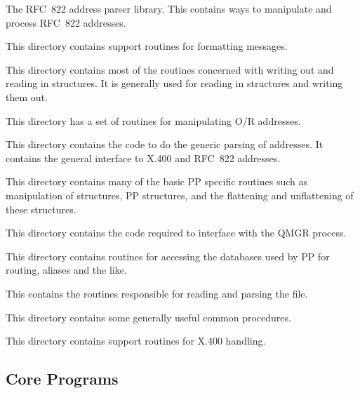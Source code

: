 \begin{describe}
\item[\verb|addr/|:]	The RFC~822 address parser
library. This
contains ways to manipulate and process RFC~822 addresses.

\item[\verb|format/|:]	This directory contains support routines for
formatting messages.

\item[\verb|io/|:]	This directory contains most of the routines
concerned with writing out and reading in structures. It is generally
used for reading in structures and writing them out.

\item[\verb|or/|:]	This directory has a set of routines for
manipulating O/R addresses.

\item[\verb|parse/|:]	This directory contains the code to do the generic
parsing of addresses. It contains the general interface to X.400 and
RFC~822 addresses.

\item[\verb|pp/|:]	This directory contains many of the basic PP
specific routines such as manipulation of structures, PP structures, and
the flattening and unflattening of these structures.

\item[\verb|qmgr/|:]	This directory contains the code required to
interface with the QMGR process.

\item[\verb|table/|:]	This directory contains routines for accessing
the databases used by PP for routing, aliases and the like.

\item[\verb|tai/|:]	This contains the routines responsible for
reading and parsing the  file.

\item[\verb|util/|:]	This directory contains some
generally useful common procedures.

\item[\verb|x400/|:]	This directory contains
support routines for X.400 handling.
\end{describe}

\subsection{Core Programs}

